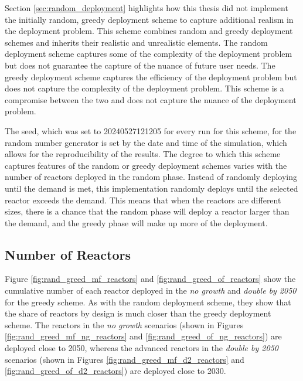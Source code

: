 
Section \ref{sec:random_deployment} highlights how this thesis did not implement the initially random, greedy deployment scheme to capture additional realism in the deployment problem. This scheme combines random and greedy deployment schemes and inherits their realistic and unrealistic elements. The random deployment scheme captures some of the complexity of the deployment problem but does not guarantee the capture of the nuance of future user needs. The greedy deployment scheme captures the efficiency of the deployment problem but does not capture the complexity of the deployment problem. This scheme is a compromise between the two and does not capture the nuance of the deployment problem.

The seed, which was set to 20240527121205 for every run for this scheme, for
the random number generator is set by the date and time of the simulation,
which allows for the reproducibility of the results. The degree to which this
scheme captures features of the random or greedy deployment schemes varies with
the number of reactors deployed in the random phase. Instead of randomly
deploying until the demand is met, this implementation randomly deploys until
the selected reactor exceeds the demand. This means that when the reactors are
different sizes, there is a chance that the random phase will deploy a reactor
larger than the demand, and the greedy phase will make up more of
the deployment.


\subsection{Number of Reactors}
\label{sec:rand_greed_reactors}

Figure \ref{fig:rand_greed_mf_reactors} and \ref{fig:rand_greed_of_reactors} show the cumulative number of each reactor deployed in the \textit{no growth} and \textit{double by 2050} for the greedy scheme. As with the random deployment scheme, they show that the share of reactors by design is much closer than the greedy deployment scheme. The reactors in the \textit{no growth} scenarios (shown in Figures \ref{fig:rand_greed_mf_ng_reactors} and \ref{fig:rand_greed_of_ng_reactors}) are deployed close to 2050, whereas the advanced reactors in the \textit{double by 2050} scenarios (shown in Figures \ref{fig:rand_greed_mf_d2_reactors} and \ref{fig:rand_greed_of_d2_reactors}) are deployed close to 2030.


